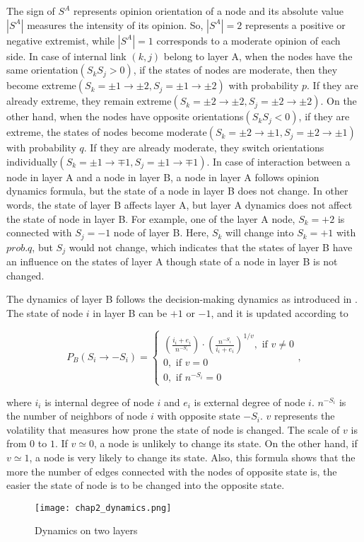 The sign of $S^A$ represents opinion orientation of a node and its absolute value $|S^A|$ measures the intensity of its opinion. So, $|S^A|=2$ represents a positive or negative extremist, while  $|S^A|=1$ corresponds to a moderate opinion of each side. In case of internal link $(k, j)$ belong to layer A, when the nodes have the same orientation$(S_kS_j>0)$, if the states of nodes are moderate, then they become extreme$(S_k=\pm1 \rightarrow \pm2, S_j= \pm1 \rightarrow \pm2)$ with probability $p$. If they are already extreme, they remain extreme$(S_k=\pm2 \rightarrow \pm2, S_j= \pm2 \rightarrow \pm2)$. On the other hand, when the nodes have opposite orientations$(S_kS_j<0)$, if they are extreme, the states of nodes become moderate$(S_k=\pm2 \rightarrow \pm1, S_j= \pm2 \rightarrow \pm1)$ with probability $q$. If they are already moderate, they switch orientations individually$(S_k=\pm1 \rightarrow \mp1, S_j= \pm1 \rightarrow \mp1)$.  In case of interaction between a node in layer A and a node in layer B, a node in layer A follows opinion dynamics formula, but the state of a node in layer B does not change. In other words, the state of layer B affects layer A, but layer A dynamics does not affect the state of node in layer B. For example, one of the layer A node, $S_k = +2$ is connected with  $S_j = -1$ node of layer B. Here, $S_k$ will change into $S_k = +1$ with $prob.q$, but $S_j$ would not change, which indicates that the states of layer B have an influence on the states of layer A though state of a node in layer B is not changed.

The dynamics of layer B follows the decision-making dynamics as introduced in \parencite{abrams2003, vazquez2010}. The state of node $i$ in layer B can be $+1$ or $-1$, and it is updated according to

\begin{equation}
{P_B}({S_i} \to  - {S_i}) = \begin{cases}
{\left({\displaystyle\frac{{{i_i} + {e_i}}}{{{n^{ - {S_i}}}}}}\right)}{\cdot}{\left({\displaystyle\frac{{n^{-{S_i}}}}{{{i_i} + {e_i}}}} \right)^{1/v}}  ,\mbox{ if } v \ne 0\\
0,\mbox{ if } v = 0\\
0,\mbox{ if } {n^{ - {S_i}}} = 0
\end{cases},
\end{equation}

where $i_i$ is internal degree of node $i$ and $e_i$ is external degree of node $i$. $n^{-S_i}$ is the number of neighbors of node $i$ with opposite state $-S_i$. $v$ represents the volatility that measures how prone the state of node is changed. The scale of $v$ is from $0$ to $1$. If $v \simeq 0$,  a node is unlikely to change its state. On the other hand, if $v \simeq 1$, a node is very likely to change its state. Also, this formula shows that the more the number of edges connected with the nodes of opposite state is, the easier the state of node is to be changed into the opposite state.
\begin{figure}[!htb]
	\centering
	\texttt{[image: chap2\_dynamics.png]}
	\caption{Dynamics on two layers}
	\label{chap2_dynamics}
\end{figure}

